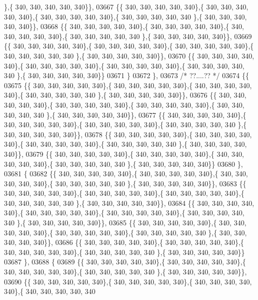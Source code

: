 \begin{DoxyCode}
      \},\{ 340, 340, 340, 340, 340\}\},
03667 \{\{ 340, 340, 340, 340, 340\},\{ 340, 340, 340, 340, 340\},\{ 340, 340, 340, 340, 340\},\{ 340, 340, 340, 340, 340
      \},\{ 340, 340, 340, 340, 340\}\},
03668 \{\{ 340, 340, 340, 340, 340\},\{ 340, 340, 340, 340, 340\},\{ 340, 340, 340, 340, 340\},\{ 340, 340, 340, 340, 340
      \},\{ 340, 340, 340, 340, 340\}\},
03669 \{\{ 340, 340, 340, 340, 340\},\{ 340, 340, 340, 340, 340\},\{ 340, 340, 340, 340, 340\},\{ 340, 340, 340, 340, 340
      \},\{ 340, 340, 340, 340, 340\}\},
03670 \{\{ 340, 340, 340, 340, 340\},\{ 340, 340, 340, 340, 340\},\{ 340, 340, 340, 340, 340\},\{ 340, 340, 340, 340, 340
      \},\{ 340, 340, 340, 340, 340\}\}
03671 \}
03672 \},
03673 \textcolor{comment}{/* ??....?? */}
03674 \{\{
03675 \{\{ 340, 340, 340, 340, 340\},\{ 340, 340, 340, 340, 340\},\{ 340, 340, 340, 340, 340\},\{ 340, 340, 340, 340, 340
      \},\{ 340, 340, 340, 340, 340\}\},
03676 \{\{ 340, 340, 340, 340, 340\},\{ 340, 340, 340, 340, 340\},\{ 340, 340, 340, 340, 340\},\{ 340, 340, 340, 340, 340
      \},\{ 340, 340, 340, 340, 340\}\},
03677 \{\{ 340, 340, 340, 340, 340\},\{ 340, 340, 340, 340, 340\},\{ 340, 340, 340, 340, 340\},\{ 340, 340, 340, 340, 340
      \},\{ 340, 340, 340, 340, 340\}\},
03678 \{\{ 340, 340, 340, 340, 340\},\{ 340, 340, 340, 340, 340\},\{ 340, 340, 340, 340, 340\},\{ 340, 340, 340, 340, 340
      \},\{ 340, 340, 340, 340, 340\}\},
03679 \{\{ 340, 340, 340, 340, 340\},\{ 340, 340, 340, 340, 340\},\{ 340, 340, 340, 340, 340\},\{ 340, 340, 340, 340, 340
      \},\{ 340, 340, 340, 340, 340\}\}
03680 \},
03681 \{
03682 \{\{ 340, 340, 340, 340, 340\},\{ 340, 340, 340, 340, 340\},\{ 340, 340, 340, 340, 340\},\{ 340, 340, 340, 340, 340
      \},\{ 340, 340, 340, 340, 340\}\},
03683 \{\{ 340, 340, 340, 340, 340\},\{ 340, 340, 340, 340, 340\},\{ 340, 340, 340, 340, 340\},\{ 340, 340, 340, 340, 340
      \},\{ 340, 340, 340, 340, 340\}\},
03684 \{\{ 340, 340, 340, 340, 340\},\{ 340, 340, 340, 340, 340\},\{ 340, 340, 340, 340, 340\},\{ 340, 340, 340, 340, 340
      \},\{ 340, 340, 340, 340, 340\}\},
03685 \{\{ 340, 340, 340, 340, 340\},\{ 340, 340, 340, 340, 340\},\{ 340, 340, 340, 340, 340\},\{ 340, 340, 340, 340, 340
      \},\{ 340, 340, 340, 340, 340\}\},
03686 \{\{ 340, 340, 340, 340, 340\},\{ 340, 340, 340, 340, 340\},\{ 340, 340, 340, 340, 340\},\{ 340, 340, 340, 340, 340
      \},\{ 340, 340, 340, 340, 340\}\}
03687 \},
03688 \{
03689 \{\{ 340, 340, 340, 340, 340\},\{ 340, 340, 340, 340, 340\},\{ 340, 340, 340, 340, 340\},\{ 340, 340, 340, 340, 340
      \},\{ 340, 340, 340, 340, 340\}\},
03690 \{\{ 340, 340, 340, 340, 340\},\{ 340, 340, 340, 340, 340\},\{ 340, 340, 340, 340, 340\},\{ 340, 340, 340, 340, 340

\end{DoxyCode}
